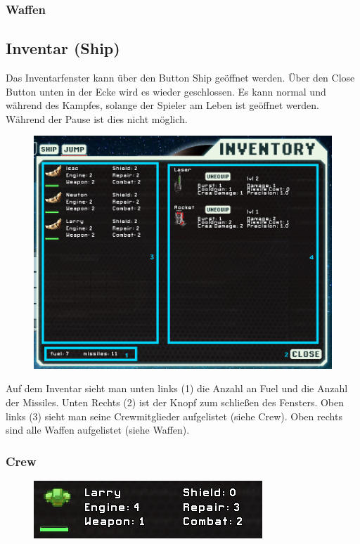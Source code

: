 \documentclass[fontsize=12pt,paper=a4,twoside]{scrartcl}
\begin{document}
\subsubsection{Waffen}


\subsection{Inventar (Ship)}

Das Inventarfenster kann über den Button Ship geöffnet werden. Über den Close Button unten in der Ecke wird es wieder geschlossen. Es kann normal und während des Kampfes, solange der Spieler am Leben ist geöffnet werden. Während der Pause ist dies nicht möglich. 

\begin{figure}[H]
\centering
\includegraphics[width=0.8\linewidth]{DasSpiel/Inventar/inventar.png}
\end{figure} 

Auf dem Inventar sieht man unten links (1) die Anzahl an Fuel und die Anzahl der Missiles. Unten Rechts (2) ist der Knopf zum schließen des Fensters. Oben links (3) sieht man seine Crewmitglieder aufgelistet (siehe Crew). Oben rechts sind alle Waffen aufgelistet (siehe Waffen). 

\subsubsection{Crew}

\begin{figure}[H]
\centering
\includegraphics[width=0.8\linewidth]{DasSpiel/Inventar/crew.png}
\end{figure} 
\end{document}
